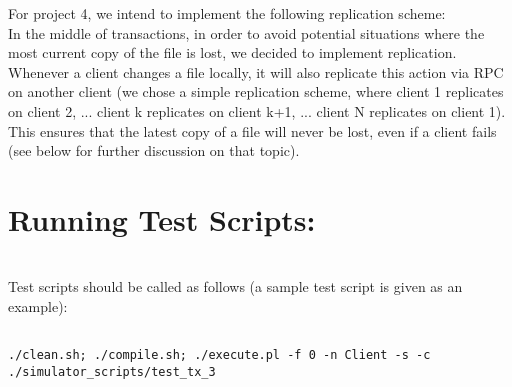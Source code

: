 \documentclass[11pt]{article}
\begin{document}
For project 4, we intend to implement the following replication scheme:\\

In the middle of transactions, in order to avoid potential situations where the most current copy of the file is lost, we decided to implement replication. Whenever a client changes a file locally,
it will also replicate this action via RPC on another client (we chose a simple replication scheme, where client 1 replicates on client 2, ... client k replicates on client k+1, ... client N replicates on client 1).
This ensures that the latest copy of a file will never be lost, even if a client fails (see below for further discussion on that topic). \\

\section{Running Test Scripts:}\\

Test scripts should be called as follows (a sample test script is given as an example):

\begin{verbatim}

./clean.sh; ./compile.sh; ./execute.pl -f 0 -n Client -s -c ./simulator_scripts/test_tx_3 

\end{verbatim}
\end{document}
